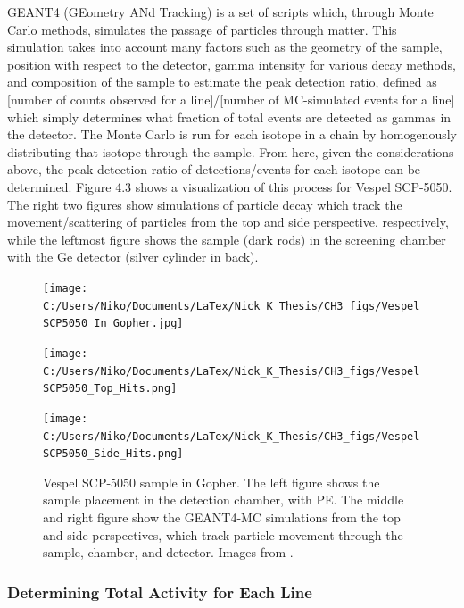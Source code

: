 \documentclass{report}
\begin{document}
GEANT4 (GEometry ANd Tracking) is a set of scripts which, through Monte Carlo methods, simulates the passage of particles through matter. This simulation takes into account many factors such as the geometry of the sample, position with respect to the detector, gamma intensity for various decay methods, and composition of the sample to estimate the peak detection ratio, defined as [number of counts observed for a line]/[number of MC-simulated events for a line] which simply determines what fraction of total events are detected as gammas in the detector. The Monte Carlo is run for each isotope in a chain by homogenously distributing that isotope through the sample. From here, given the considerations above, the peak detection ratio of detections/events for each isotope can be determined. Figure 4.3 shows a visualization of this process for Vespel SCP-5050. The right two figures show simulations of particle decay which track the movement/scattering of particles from the top and side perspective, respectively, while the leftmost figure shows the sample (dark rods) in the screening chamber with the Ge detector (silver cylinder in back).

\begin{figure}[h]
\centering
\begin{minipage}{.34\textwidth}
\texttt{[image: C:/Users/Niko/Documents/LaTex/Nick\_K\_Thesis/CH3\_figs/VespelSCP5050\_In\_Gopher.jpg]}
\end{minipage}
\begin{minipage}{.3\textwidth}
\texttt{[image: C:/Users/Niko/Documents/LaTex/Nick\_K\_Thesis/CH3\_figs/VespelSCP5050\_Top\_Hits.png]}
\end{minipage}
\begin{minipage}{.3\textwidth}
\texttt{[image: C:/Users/Niko/Documents/LaTex/Nick\_K\_Thesis/CH3\_figs/VespelSCP5050\_Side\_Hits.png]}
\end{minipage}
\caption{Vespel SCP-5050 sample in Gopher. The left figure shows the sample placement in the detection chamber, with PE. The middle and right figure show the GEANT4-MC simulations from the top and side perspectives, which track particle movement through the sample, chamber, and detector. Images from \cite{GopherSCP5050}.}
\end{figure}

\subsubsection{Determining Total Activity for Each Line}
\end{document}

